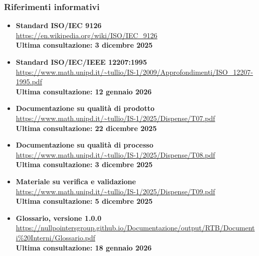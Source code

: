 	\subsubsection{Riferimenti informativi}
	\begin{itemize}[itemsep=5pt, parsep=5pt, label=$\scriptstyle\bullet$]

    \item \textbf{Standard ISO/IEC 9126}\\
     \url{https://en.wikipedia.org/wiki/ISO/IEC_9126}\\[3pt]
    \textbf{Ultima consultazione: 3 dicembre 2025}

    \item \textbf{Standard ISO/IEC/IEEE 12207:1995}\\
     \url{https://www.math.unipd.it/~tullio/IS-1/2009/Approfondimenti/ISO_12207-1995.pdf}\\[3pt]
    \textbf{Ultima consultazione: 12 gennaio 2026}

    \item \textbf{Documentazione su qualità di prodotto}\\
     \url{https://www.math.unipd.it/~tullio/IS-1/2025/Dispense/T07.pdf}\\[3pt]
    \textbf{Ultima consultazione: 22 dicembre 2025}

	\item \textbf{Documentazione su qualità di processo}\\
     \url{https://www.math.unipd.it/~tullio/IS-1/2025/Dispense/T08.pdf}\\[3pt]
    \textbf{Ultima consultazione: 3 dicembre 2025}

	\item \textbf{Materiale su verifica e validazione}\\
     \url{https://www.math.unipd.it/~tullio/IS-1/2025/Dispense/T09.pdf}\\[3pt]
    \textbf{Ultima consultazione: 5 dicembre 2025}

	\item \textbf{Glossario, versione 1.0.0}\\
     \url{https://nullpointersgroup.github.io/Documentazione/output/RTB/Documenti%20Interni/Glossario.pdf}\\[3pt]
    \textbf{Ultima consultazione: 18 gennaio 2026}

	\end{itemize}
